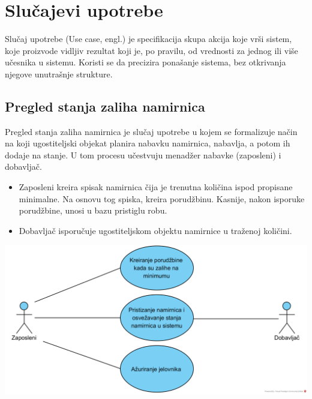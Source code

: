 \documentclass{article}
\begin{document}
\section{Slučajevi upotrebe}
Slučaj upotrebe (Use case, engl.) je specifikacija skupa akcija koje vrši sistem, koje proizvode vidljiv rezultat koji je, po pravilu, od vrednosti za jednog ili više učesnika u sistemu. Koristi se da precizira ponašanje sistema, bez otkrivanja njegove unutrašnje strukture.


\subsection{Pregled stanja zaliha namirnica}
Pregled stanja zaliha namirnica je slučaj upotrebe u kojem se formalizuje način na koji ugostiteljski objekat planira nabavku namirnica, nabavlja, a potom ih dodaje na stanje. U tom procesu učestvuju menadžer nabavke (zaposleni) i dobavljač. 

\begin{itemize}
\item Zaposleni kreira spisak namirnica čija je trenutna količina ispod propisane minimalne. Na osnovu tog spiska, kreira porudžbinu. Kasnije, nakon isporuke porudžbine, unosi u bazu pristiglu robu.
\item Dobavljač isporučuje ugostiteljskom objektu namirnice u traženoj količini.
\end{itemize}
\includegraphics[width=\textwidth]{SU_1_zalihe.png}
\end{document}
